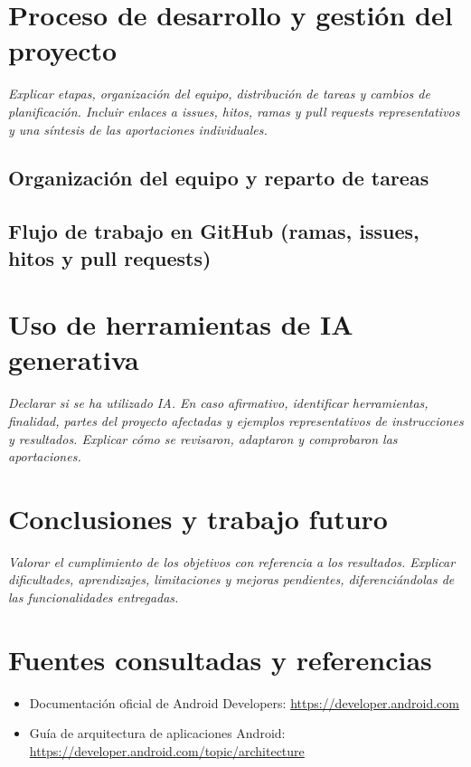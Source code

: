 \documentclass[11pt,a4paper]{article}
\begin{document}
\section{Proceso de desarrollo y gestión del proyecto}
\textit{Explicar etapas, organización del equipo, distribución de tareas y cambios de planificación. Incluir enlaces a issues, hitos, ramas y pull requests representativos y una síntesis de las aportaciones individuales.}

\subsection{Organización del equipo y reparto de tareas}
\subsection{Flujo de trabajo en GitHub (ramas, issues, hitos y pull requests)}

\section{Uso de herramientas de IA generativa}
\textit{Declarar si se ha utilizado IA. En caso afirmativo, identificar herramientas, finalidad, partes del proyecto afectadas y ejemplos representativos de instrucciones y resultados. Explicar cómo se revisaron, adaptaron y comprobaron las aportaciones.}

\section{Conclusiones y trabajo futuro}
\textit{Valorar el cumplimiento de los objetivos con referencia a los resultados. Explicar dificultades, aprendizajes, limitaciones y mejoras pendientes, diferenciándolas de las funcionalidades entregadas.}

\section*{Fuentes consultadas y referencias}
\begin{itemize}
    \item Documentación oficial de Android Developers: \url{https://developer.android.com}
    \item Guía de arquitectura de aplicaciones Android: \url{https://developer.android.com/topic/architecture}
\end{itemize}
\end{document}

